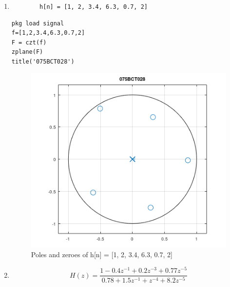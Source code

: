 \documentclass[12pt]{article}
\begin{document}
\begin{enumerate}
    \item \begin{verbatim}
        h[n] = [1, 2, 3.4, 6.3, 0.7, 2]
    \end{verbatim}
    \begin{Verbatim}[frame=single]
pkg load signal
f=[1,2,3.4,6.3,0.7,2]
F = czt(f)
zplane(F)
title('075BCT028')
    \end{Verbatim}
    \begin{figure}[h!]
        \centering
        \includegraphics{labss/Lab5_1.PNG}
        \caption{Poles and zeroes of  h[n] = [1, 2, 3.4, 6.3, 0.7, 2]}
    \end{figure}
    \item \begin{equation}
        H(z) =  \frac{1 - 0.4 z^{-1} + 0.2 z^{-3} + 0.77 z^{-5} }{ 0.78 + 1.5 z^{-1} +z^{-4} + 8.2 z^{-5} } \nonumber
    \end{equation}


\end{enumerate}
\end{document}
